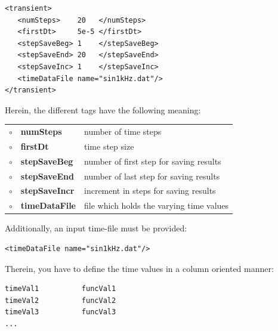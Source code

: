 \begin{verbatim}
<transient>
   <numSteps>    20   </numSteps>
   <firstDt>     5e-5 </firstDt>
   <stepSaveBeg> 1    </stepSaveBeg>
   <stepSaveEnd> 20   </stepSaveEnd>
   <stepSaveInc> 1    </stepSaveInc>
   <timeDataFile name="sin1kHz.dat"/>
</transient>
\end{verbatim}

\noindent
Herein, the different tags have the following meaning:\\
\begin{tabular}{lll} 
$\circ$ & {\bf numSteps}    &  number of time steps\\
$\circ$ & {\bf firstDt }    &  time step size\\
$\circ$ & {\bf stepSaveBeg}  &  number of first step for saving results\\
$\circ$ & {\bf stepSaveEnd}  &  number of last step for saving results\\
$\circ$ & {\bf stepSaveIncr} & increment in steps for saving results\\
$\circ$ & {\bf timeDataFile} & file which holds the varying time values
\end{tabular}
\bigskip

\noindent
Additionally, an input time-file must be provided:
\begin{verbatim} 
<timeDataFile name="sin1kHz.dat"/>
\end{verbatim} 
Therein, you have to define the time values in a column oriented
manner:
\begin{verbatim}
timeVal1          funcVal1
timeVal2          funcVal2
timeVal3          funcVal3
...
\end{verbatim}

